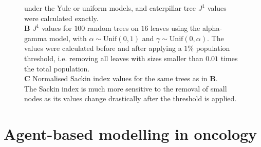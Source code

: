\begin{figure}[h]
{    under the Yule or uniform models, and caterpillar tree $J^1$ values were
    calculated exactly. \\
    \textbf{B} $J^1$ values for $100$ random trees on $16$ leaves using the
    alpha-gamma model, with $\alpha\sim \text{Unif}(0,1)$ and $\gamma\sim
    \text{Unif}(0,\alpha)$. The values were calculated before and after
    applying a $1\%$ population threshold, i.e. removing all leaves with sizes
    smaller than $0.01$ times the total population.\\
    \textbf{C} Normalised Sackin index values for the same trees as in
    \textbf{B}.\\
    The Sackin index is much more sensitive to the removal of small nodes as
    its values change drastically after the threshold is applied.}
    \label{fig:robustness}
\end{figure}
\clearpage


\section{Agent-based modelling in oncology}\label{section:abm}

